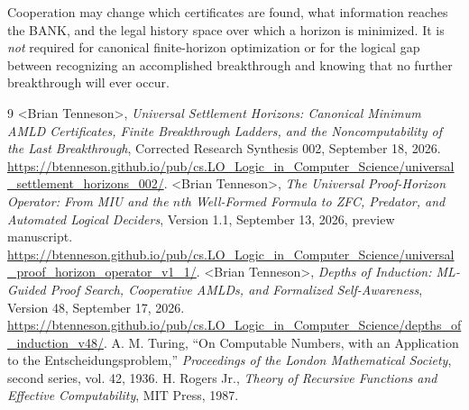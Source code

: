 \documentclass[11pt]{article}
\theoremstyle{definition}
\begin{document}
Cooperation may change which certificates are found, what information reaches the BANK, and the legal history space over which a horizon is minimized. It is \emph{not} required for canonical finite-horizon optimization or for the logical gap between recognizing an accomplished breakthrough and knowing that no further breakthrough will ever occur.

\begin{thebibliography}{9}
 \textless Brian Tenneson\textgreater, \emph{Universal Settlement Horizons: Canonical Minimum AMLD Certificates, Finite Breakthrough Ladders, and the Noncomputability of the Last Breakthrough}, Corrected Research Synthesis 002, September 18, 2026. \url{https://btenneson.github.io/pub/cs.LO_Logic_in_Computer_Science/universal_settlement_horizons_002/}.
 \textless Brian Tenneson\textgreater, \emph{The Universal Proof-Horizon Operator: From MIU and the $n$th Well-Formed Formula to ZFC, Predator, and Automated Logical Deciders}, Version 1.1, September 13, 2026, preview manuscript. \url{https://btenneson.github.io/pub/cs.LO_Logic_in_Computer_Science/universal_proof_horizon_operator_v1_1/}.
 \textless Brian Tenneson\textgreater, \emph{Depths of Induction: ML-Guided Proof Search, Cooperative AMLDs, and Formalized Self-Awareness}, Version 48, September 17, 2026. \url{https://btenneson.github.io/pub/cs.LO_Logic_in_Computer_Science/depths_of_induction_v48/}.
 A. M. Turing, ``On Computable Numbers, with an Application to the Entscheidungsproblem,'' \emph{Proceedings of the London Mathematical Society}, second series, vol. 42, 1936.
 H. Rogers Jr., \emph{Theory of Recursive Functions and Effective Computability}, MIT Press, 1987.
\end{thebibliography}


\clearpage
{}\label{sec:ai-disclaimer}
\end{document}
